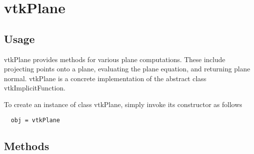 \section{vtkPlane}

\subsection{Usage}

 vtkPlane provides methods for various plane computations. These include
 projecting points onto a plane, evaluating the plane equation, and 
 returning plane normal. vtkPlane is a concrete implementation of the 
 abstract class vtkImplicitFunction.

To create an instance of class vtkPlane, simply
invoke its constructor as follows
\begin{verbatim}
  obj = vtkPlane
\end{verbatim}
\subsection{Methods}


